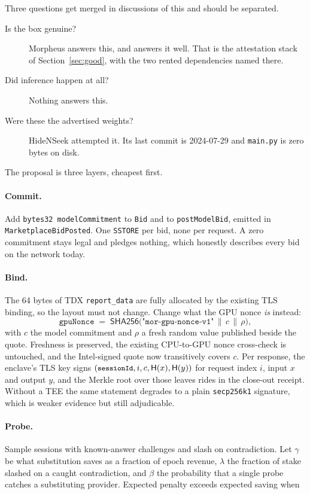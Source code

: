 \documentclass[11pt,a4paper]{article}
\newcommand{\code}[1]{\texttt{\small #1}}
\begin{document}
Three questions get merged in discussions of this and should be separated.

\begin{description}
\item[Is the box genuine?] Morpheus answers this, and answers it well. That is
the attestation stack of Section~\ref{sec:good}, with the two rented
dependencies named there.
\item[Did inference happen at all?] Nothing answers this.
\item[Were these the advertised weights?] HideNSeek attempted it. Its last
commit is 2024-07-29 and \code{main.py} is zero bytes on disk.
\end{description}

\noindent
The proposal is three layers, cheapest first.

\paragraph{Commit.} Add \code{bytes32 modelCommitment} to \code{Bid} and to
\code{postModelBid}, emitted in \code{MarketplaceBidPosted}. One \code{SSTORE}
per bid, none per request. A zero commitment stays legal and pledges nothing,
which honestly describes every bid on the network today.

\paragraph{Bind.} The 64 bytes of TDX \code{report\_data} are fully allocated
by the existing TLS binding, so the layout must not change. Change what the GPU
nonce \emph{is} instead:
\[
  \texttt{gpuNonce} \;=\; \mathsf{SHA256}\big(\texttt{"mor-gpu-nonce-v1"}
  \,\|\, c \,\|\, \rho\big),
\]
with $c$ the model commitment and $\rho$ a fresh random value published beside
the quote. Freshness is preserved, the existing CPU-to-GPU nonce cross-check is
untouched, and the Intel-signed quote now transitively covers $c$. Per response,
the enclave's TLS key signs
$(\code{sessionId}, i, c, \mathsf{H}(x), \mathsf{H}(y))$ for request index $i$,
input $x$ and output $y$, and the Merkle root over those leaves rides in the
close-out receipt. Without a TEE the same statement degrades to a plain
\code{secp256k1} signature, which is weaker evidence but still adjudicable.

\paragraph{Probe.} Sample sessions with known-answer challenges and slash on
contradiction. Let $\gamma$ be what substitution saves as a fraction of epoch
revenue, $\lambda$ the fraction of stake slashed on a caught contradiction, and
$\beta$ the probability that a single probe catches a substituting provider.
Expected penalty exceeds expected saving when
\end{document}
